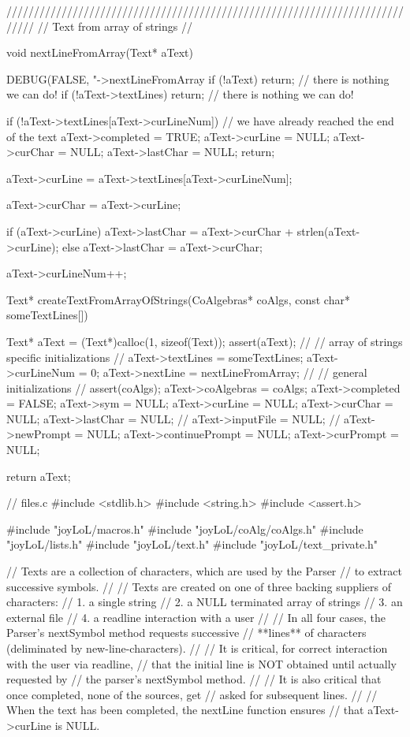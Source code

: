 /////////////////////////////////////////////////////////////////////////////
// Text from array of strings
//

void nextLineFromArray(Text* aText) {
  DEBUG(FALSE, "->nextLineFromArray %
  if (!aText) return;  // there is nothing we can do!
  if (!aText->textLines) return; // there is nothing we can do!

  if (!aText->textLines[aText->curLineNum]) {
    // we have already reached the end of the text
    aText->completed  = TRUE;
    aText->curLine    = NULL;
    aText->curChar    = NULL;
    aText->lastChar   = NULL;
    return;
  }

  aText->curLine  = aText->textLines[aText->curLineNum];

  aText->curChar  = aText->curLine;

  if (aText->curLine) {
    aText->lastChar = aText->curChar + strlen(aText->curLine);
  } else aText->lastChar = aText->curChar;

  aText->curLineNum++;
}

Text* createTextFromArrayOfStrings(CoAlgebras* coAlgs,
                                   const char* someTextLines[]) {
  Text* aText = (Text*)calloc(1, sizeof(Text));
  assert(aText);
  //
  // array of strings specific initializations
  //
  aText->textLines  = someTextLines;
  aText->curLineNum = 0;
  aText->nextLine   = nextLineFromArray;
  //
  // general initializations
  //
  assert(coAlgs);
  aText->coAlgebras = coAlgs;
  aText->completed  = FALSE;
  aText->sym        = NULL;
  aText->curLine    = NULL;
  aText->curChar    = NULL;
  aText->lastChar   = NULL;
  //
  aText->inputFile  = NULL;
  //
  aText->newPrompt       = NULL;
  aText->continuePrompt  = NULL;
  aText->curPrompt       = NULL;

  return aText;
}
\stoptyping

\starttyping
// files.c
#include <stdlib.h>
#include <string.h>
#include <assert.h>

#include "joyLoL/macros.h"
#include "joyLoL/coAlg/coAlgs.h"
#include "joyLoL/lists.h"
#include "joyLoL/text.h"
#include "joyLoL/text_private.h"

// Texts are a collection of characters, which are used by the Parser
// to extract successive symbols.
//
// Texts are created on one of three backing suppliers of characters:
// 1. a single string
// 2. a NULL terminated array of strings
// 3. an external file
// 4. a readline interaction with a user
//
// In all four cases, the Parser's nextSymbol method requests successive
// **lines** of characters (deliminated by new-line-characters).
//
// It is critical, for correct interaction with the user via readline,
// that the initial line is NOT obtained until actually requested by
// the parser's nextSymbol method.
//
// It is also critical that once completed, none of the sources, get
// asked for subsequent lines.
//
// When the text has been completed, the nextLine function ensures
// that aText->curLine is NULL.

